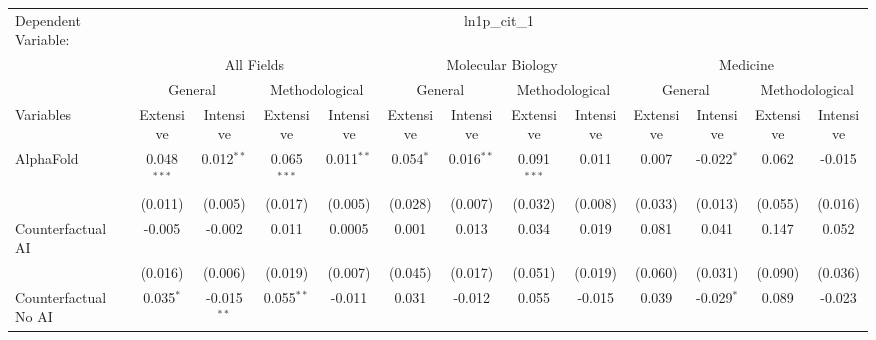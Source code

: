 \begingroup
\centering
\begin{tabular}{lcccccccccccc}
   \tabularnewline \midrule \midrule
   Dependent Variable: & \multicolumn{12}{c}{ln1p\_cit\_1}\\
 & \multicolumn{4}{c}{All Fields} & \multicolumn{4}{c}{Molecular Biology} & \multicolumn{4}{c}{Medicine} \\
\cmidrule(lr){2-5} \cmidrule(lr){6-9} \cmidrule(lr){10-13}
 & \multicolumn{2}{c}{General} & \multicolumn{2}{c}{Methodological} & \multicolumn{2}{c}{General} & \multicolumn{2}{c}{Methodological} & \multicolumn{2}{c}{General} & \multicolumn{2}{c}{Methodological} \\
\cmidrule(lr){2-3} \cmidrule(lr){4-5} \cmidrule(lr){6-7} \cmidrule(lr){8-9} \cmidrule(lr){10-11} \cmidrule(lr){12-13}
Variables & \multicolumn{1}{c}{Extensive} & \multicolumn{1}{c}{Intensive} & \multicolumn{1}{c}{Extensive} & \multicolumn{1}{c}{Intensive} & \multicolumn{1}{c}{Extensive} & \multicolumn{1}{c}{Intensive} & \multicolumn{1}{c}{Extensive} & \multicolumn{1}{c}{Intensive} & \multicolumn{1}{c}{Extensive} & \multicolumn{1}{c}{Intensive} & \multicolumn{1}{c}{Extensive} & \multicolumn{1}{c}{Intensive} \\
\cmidrule(lr){1-1}\cmidrule(lr){2-2} \cmidrule(lr){3-3} \cmidrule(lr){4-4} \cmidrule(lr){5-5} \cmidrule(lr){6-6} \cmidrule(lr){7-7} \cmidrule(lr){8-8} \cmidrule(lr){9-9} \cmidrule(lr){10-10} \cmidrule(lr){11-11} \cmidrule(lr){12-12} \cmidrule(lr){13-13}
   AlphaFold                                & 0.048$^{***}$  & 0.012$^{**}$  & 0.065$^{***}$  & 0.011$^{**}$ & 0.054$^{*}$  & 0.016$^{**}$   & 0.091$^{***}$ & 0.011    & 0.007   & -0.022$^{*}$ & 0.062   & -0.015\\   
                                            & (0.011)        & (0.005)       & (0.017)        & (0.005)      & (0.028)      & (0.007)        & (0.032)       & (0.008)  & (0.033) & (0.013)      & (0.055) & (0.016)\\   
   Counterfactual AI                        & -0.005         & -0.002        & 0.011          & 0.0005       & 0.001        & 0.013          & 0.034         & 0.019    & 0.081   & 0.041        & 0.147   & 0.052\\   
                                            & (0.016)        & (0.006)       & (0.019)        & (0.007)      & (0.045)      & (0.017)        & (0.051)       & (0.019)  & (0.060) & (0.031)      & (0.090) & (0.036)\\   
   Counterfactual No AI                     & 0.035$^{*}$    & -0.015$^{**}$ & 0.055$^{**}$   & -0.011       & 0.031        & -0.012         & 0.055         & -0.015   & 0.039   & -0.029$^{*}$ & 0.089   & -0.023\\   

\end{tabular}
